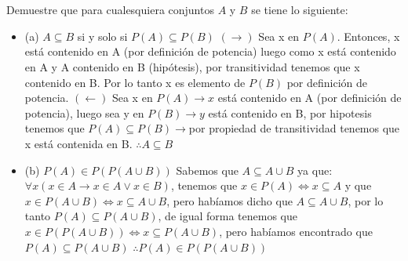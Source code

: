\section{}
Demuestre que para cualesquiera conjuntos $A$ y $B$ se tiene lo siguiente:
\begin{itemize}
	\item (a) $A \subseteq B$ si y solo si $P(A) \subseteq P(B)$\newline
	$(\rightarrow)$\newline
	Sea x en $P(A)$. Entonces, x está contenido en A (por definición de potencia) luego como x está contenido en A y A contenido en B (hipótesis), por transitividad tenemos que x contenido en B. Por lo tanto x es elemento de $P(B)$ por definición de potencia.\newline
	$(\leftarrow)$\newline
	Sea x en $P(A) \rightarrow x$ está contenido en A (por definición de potencia), luego sea y en $P(B) \rightarrow y$ está contenido en B, por hipotesis tenemos que $P(A) \subseteq P(B) \rightarrow$por  propiedad de transitividad tenemos que x está contenida en B.\newline
	$\therefore A \subseteq B$
	
	
	\item (b) $P(A) \in  P(P(A \cup B))$\newline
	Sabemos que  $A \subseteq A \cup B$ ya que:\newline
	 $\forall x (x \in A \rightarrow x \in A \lor x \in B)$, tenemos que $x \in P(A) \iff x \subseteq A$ \newline
	 y que $x \in P(A \cup B) \iff x \subseteq A \cup B$, \newline
	 pero habíamos dicho que $A \subseteq A \cup B$, por lo tanto $P(A) \subseteq P(A \cup B)$, \newline
	 de igual forma tenemos que $x \in P(P(A \cup B)) \iff x \subseteq P(A \cup B)$, pero habíamos encontrado que  $P(A) \subseteq P(A \cup B)$\newline
	$\therefore P(A) \in P(P(A \cup B))$
\end{itemize}